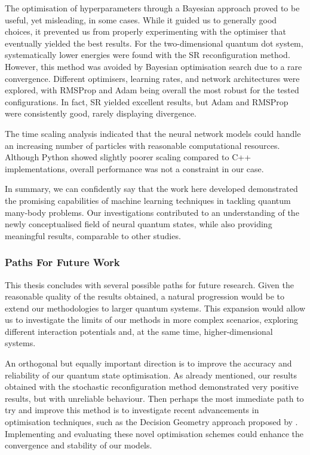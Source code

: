 The optimisation of hyperparameters through a Bayesian approach proved to be useful, yet misleading, in some cases. While it guided us to generally good choices, it prevented us from properly experimenting with the optimiser that eventually yielded the best results. For the two-dimensional quantum dot system, systematically lower energies were found with the SR reconfiguration method. However, this method was avoided by Bayesian optimisation search due to a rare convergence. Different optimisers, learning rates, and network architectures were explored, with RMSProp and Adam being overall the most robust for the tested configurations. In fact, SR yielded excellent results, but Adam and RMSProp were consistently good, rarely displaying divergence. 

The time scaling analysis indicated that the neural network models could handle an increasing number of particles with reasonable computational resources. Although Python showed slightly poorer scaling compared to C++ implementations, overall performance was not a constraint in our case.

In summary, we can confidently say that the work here developed demonstrated the promising capabilities of machine learning techniques in tackling quantum many-body problems. Our investigations contributed to an understanding of the newly conceptualised field of neural quantum states, while also providing meaningful results, comparable to other studies.


\subsubsection{Paths For Future Work}

This thesis concludes with several possible paths for future research. Given the reasonable quality of the results obtained, a natural progression would be to extend our methodologies to larger quantum systems. This expansion would allow us to investigate the limits of our methods in more complex scenarios, exploring different interaction potentials and, at the same time, higher-dimensional systems.

An orthogonal but equally important direction is to improve the accuracy and reliability of our quantum state optimisation. As already mentioned, our results obtained with the stochastic reconfiguration method demonstrated very positive results, but with unreliable behaviour. Then perhaps the most immediate path to try and improve this method is to investigate recent advancements in optimisation techniques, such as the Decision Geometry approach proposed by \cite{drissi2024second}. Implementing and evaluating these novel optimisation schemes could enhance the convergence and stability of our models.

